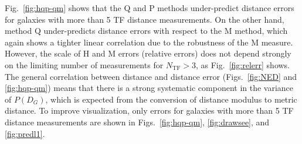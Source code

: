 \documentclass[a4paper,fleqn,usenatbib]{mnras}
\begin{document}
Fig.~\ref{fig:hqp-qm} shows that the Q and P methods under-predict distance errors for galaxies with more than 5 TF distance measurements. On the other hand, method Q under-predicts distance errors with respect to the M method, which again shows a tighter linear correlation due to the robustness of the M measure. However, the scale of H and M errors (relative errors) does not depend strongly on the limiting number of measurements for $N_\mathrm{TF}>3$, as Fig.~\ref{fig:relerr} shows. \\

The general correlation between distance and distance error (Figs.~\ref{fig:NED} and \ref{fig:hqp-qm}) means that there is a strong systematic component in the variance of $P(D_G)$, which is expected from the conversion of distance modulus to metric distance. To improve visualization, only errors for galaxies with more than 5 TF distance measurements are shown in Figs.~\ref{fig:hqp-qm}, \ref{fig:drawsee}, and \ref{fig:predl1}.\\
\end{document}

